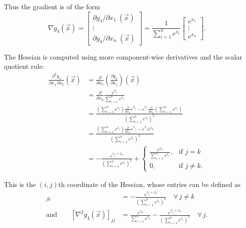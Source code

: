 \documentclass[10pt]{article}
\theoremstyle{definition}
\theoremstyle{plain}
\begin{document}
\begin{enumerate}[label=(\alph*)]
\begin{enumerate}[label=\roman*.]
    Thus the gradient is of the form
    \begin{equation}
    \nabla g_4(\vec{x}) = \begin{bmatrix} \partial g_4 / \partial x_1\;(\vec{x}) \\ \vdots \\ \partial g_4 / \partial x_n\;(\vec{x}) \end{bmatrix} = \frac{1}{\sum_{i=1}^n e^{x_i}} \begin{bmatrix} e^{x_1} \\ \vdots \\ e^{x_n} \end{bmatrix}.
    \end{equation}

    The Hessian is computed using more component-wise derivatives and the scalar quotient rule:
    \begin{align}
    \frac{\partial^2 g_4}{\partial x_j\,\partial x_k}(\vec{x}) &= \frac{\partial}{\partial x_k}\left(\frac{\partial g_4}{\partial x_j}\right)(\vec{x}) \\
    &= \frac{\partial}{\partial x_k}\frac{e^{x_j}}{\sum_{i=1}^n e^{x_i}} \\
    &= \frac{(\sum_{i=1}^n e^{x_i})\frac{\partial}{\partial x_k}e^{x_j} - e^{x_j}\frac{\partial}{\partial x_k}(\sum_{i=1}^n e^{x_i})}{(\sum_{i=1}^n e^{x_i})^2} \\
    &= \frac{(\sum_{i=1}^n e^{x_i})\frac{\partial}{\partial x_k}e^{x_j} - e^{x_j} e^{x_k}}{(\sum_{i=1}^n e^{x_i})^2} \\
    &= -\frac{e^{x_j + x_k}}{(\sum_{i=1}^n e^{x_i})^2} + \begin{cases} \frac{e^{x_k}}{\sum_{i=1}^n e^{x_i}}, & \text{if } j = k \\ 0, & \text{if } j \neq k. \end{cases}
    \end{align}

    This is the $(i,j)$th coordinate of the Hessian, whose entries can be defined as
    \begin{align}
    [\nabla^2 g_4(\vec{x})]_{jk} &= -\frac{e^{x_j + x_k}}{(\sum_{i=1}^n e^{x_i})^2} \quad \forall\, j \neq k \\
    \text{and} \qquad [\nabla^2 g_4(\vec{x})]_{jj} &= \frac{e^{x_k}}{\sum_{i=1}^n e^{x_i}} - \frac{e^{x_j + x_k}}{(\sum_{i=1}^n e^{x_i})^2} \quad \forall\, j.
    \end{align}


\end{enumerate}
\end{enumerate}
\end{document}
